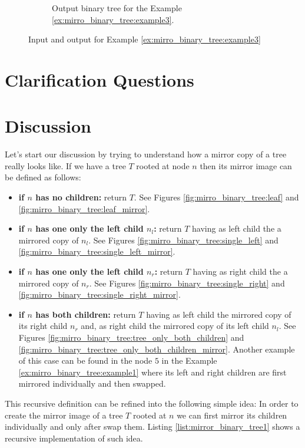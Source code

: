 \begin{figure}
\begin{subfigure}[b]{0.4\textwidth}
		\caption{Output binary tree for the Example \ref{ex:mirro_binary_tree:example3}.}
		\label{fig:mirro_binary_tree:example3_1}
	 \end{subfigure}
	 \caption[]{Input and output for Example \ref{ex:mirro_binary_tree:example3}}

\end{figure}




\section{Clarification Questions}


\begin{QandA}
	\item 
	\begin{answered}
		\textit{}
	\end{answered}
	
\end{QandA}

\section{Discussion}
\label{mirror_binary_tree:sec:discussion}
Let's start our discussion by trying to understand how a mirror copy of a tree really looks like. 
If we have a tree $T$ rooted at node $n$ then its mirror image  can be defined as follows:
\begin{itemize}
	\item \textbf{if $n$ has no children:} return  $T$. See Figures \ref{fig:mirro_binary_tree:leaf} and \ref{fig:mirro_binary_tree:leaf_mirror}.
	\item \textbf{if $n$ has one only the left child $n_l$:}  return $T$ having as left child the a mirrored copy of $n_l$. See Figures \ref{fig:mirro_binary_tree:single_left} and \ref{fig:mirro_binary_tree:single_left_mirror}.
	\item \textbf{if $n$ has one only the left child $n_r$:}  return $T$ having as right child the a mirrored copy of $n_r$. See Figures \ref{fig:mirro_binary_tree:single_right} and \ref{fig:mirro_binary_tree:single_right_mirror}. 
	\item \textbf{if $n$ has both children:} return $T$ having as left child the mirrored copy of its right child $n_r$ and,
	 as right child the mirrored copy of its left child $n_l$.  See Figures \ref{fig:mirro_binary_tree:tree_only_both_children} and \ref{fig:mirro_binary_tree:tree_only_both_children_mirror}.
	 Another example of this case can be found in the node $5$ in the Example \ref{ex:mirro_binary_tree:example1}
	 where its left and right children are first mirrored individually and then swapped. 
\end{itemize}
This recursive definition can be refined into the following simple idea: In order to create the mirror image of a tree $T$ rooted at $n$ we can first mirror its children individually and only after swap them.
Listing \ref{list:mirror_binary_tree1} shows a recursive implementation of such idea.


